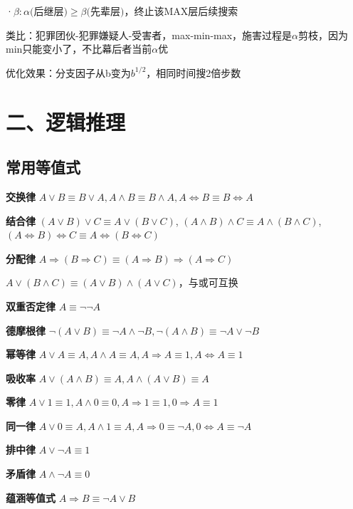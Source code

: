 	·$\beta : \alpha \text{(后继层)} \geq \beta \text{(先辈层)，}\text{终止该} \mathrm{MAX} \text{层后续搜索}$
	
	类比：犯罪团伙-犯罪嫌疑人-受害者，max-min-max，施害过程是$\alpha$剪枝，因为min只能变小了，不比幕后者当前$\alpha$优
	
	优化效果：分支因子从b变为$b^{1/2}$，相同时间搜2倍步数
	
	\section*{二、逻辑推理}
	
	\subsection*{常用等值式}
	
	\textbf{交换律} $A \vee B  \equiv B \vee A, A \land B  \equiv B \land A, A \Leftrightarrow B  \equiv B \Leftrightarrow A$
	
	\textbf{结合律} $(A \vee B) \vee C  \equiv A \vee (B \vee C)$, $(A \land B) \land C  \equiv A \land (B \land C)$, $(A \Leftrightarrow B) \Leftrightarrow C  \equiv A \Leftrightarrow (B \Leftrightarrow C)$
	
	\textbf{分配律} $A \Rightarrow (B \Rightarrow C)  \equiv (A \Rightarrow B) \Rightarrow (A \Rightarrow C)$
	
	$A \vee (B \land C)  \equiv (A \vee B) \land (A \vee C)$，与或可互换
	
	\textbf{双重否定律} $A  \equiv \neg \neg A$
	
	\textbf{德摩根律} $\neg (A \vee B)  \equiv \neg A \land \neg B, \neg (A \land B)  \equiv \neg A \vee \neg B$
	
	\textbf{幂等律} $A \vee A \equiv A, A \land A \equiv A, A \Rightarrow A \equiv 1, A \Leftrightarrow A  \equiv 1$
	
	\textbf{吸收率} $A \vee (A \land B)  \equiv A, A \land (A \vee B)  \equiv A$
	
	\textbf{零律} $A \vee 1  \equiv 1, A \land 0 \equiv 0, A \Rightarrow 1 \equiv 1, 0 \Rightarrow A \equiv 1$
	
	\textbf{同一律} $A \vee 0  \equiv A, A \land 1  \equiv A, A \Rightarrow 0  \equiv \lnot A, 0 \Leftrightarrow A  \equiv \lnot A$
	
	\textbf{排中律} $A \vee \neg A  \equiv 1$
	
	\textbf{矛盾律} $A \land \neg A  \equiv 0$
	
	\textbf{蕴涵等值式} $A \Rightarrow B  \equiv \neg A \vee B$
	
